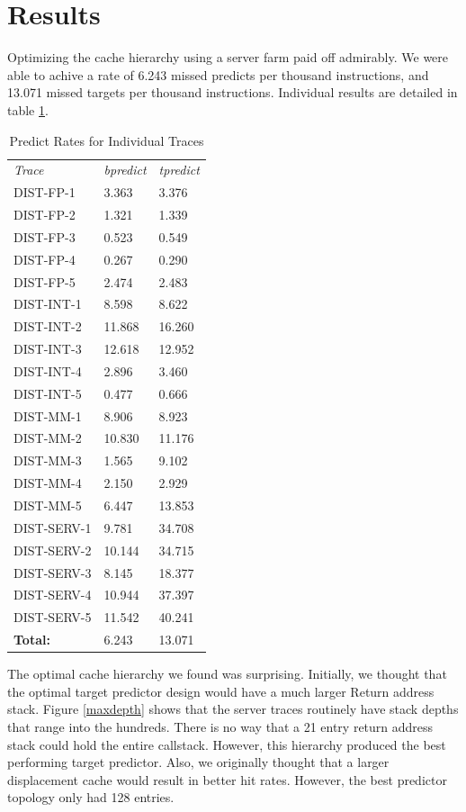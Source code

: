 \documentclass[twocolumn]{article}
\begin{document}
\section{Results}

Optimizing the cache hierarchy using a server farm paid off
admirably. We were able to achive a rate of 6.243 missed predicts per
thousand instructions, and 13.071 missed targets per thousand
instructions. Individual results are detailed in table \ref{bdibd}.


\begin{table}\begin{center}\begin{tabular}{lll}
\textit{Trace} & \textit{bpredict} & \textit{tpredict} \\
DIST-FP-1  & 3.363 & 3.376 \\
DIST-FP-2  & 1.321 & 1.339 \\
DIST-FP-3  & 0.523 & 0.549 \\
DIST-FP-4  & 0.267 & 0.290 \\
DIST-FP-5  & 2.474 & 2.483 \\
DIST-INT-1 & 8.598 & 8.622 \\
DIST-INT-2 &11.868 &16.260 \\
DIST-INT-3 &12.618 &12.952 \\
DIST-INT-4 & 2.896 & 3.460 \\
DIST-INT-5 & 0.477 & 0.666 \\
DIST-MM-1  & 8.906 & 8.923 \\
DIST-MM-2  &10.830 &11.176 \\
DIST-MM-3  & 1.565 & 9.102 \\
DIST-MM-4  & 2.150 & 2.929 \\
DIST-MM-5  & 6.447 &13.853 \\
DIST-SERV-1& 9.781 &34.708 \\
DIST-SERV-2&10.144 &34.715 \\
DIST-SERV-3& 8.145 &18.377 \\
DIST-SERV-4&10.944 &37.397 \\
DIST-SERV-5&11.542 &40.241 \\
\hline
\textbf{Total:} & 6.243&13.071
\end{tabular}\end{center}
\caption{Predict Rates for Individual Traces}
\label{bdibd}
\end{table}

The optimal cache hierarchy we found was surprising. Initially, we
thought that the optimal target predictor design would have a much
larger Return address stack. Figure \ref{maxdepth} shows that the
server traces routinely have stack depths that range into the
hundreds. There is no way that a 21 entry return address stack could
hold the entire callstack. However, this hierarchy produced the best
performing target predictor. Also, we originally thought that a larger
displacement cache would result in better hit rates. However, the best
predictor topology only had 128 entries.
\end{document}
